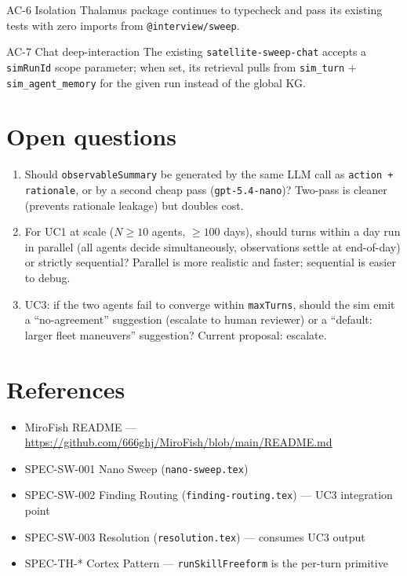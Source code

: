 \begin{ac}{AC-6 Isolation}
Thalamus package continues to typecheck and pass its existing tests with zero imports from \texttt{@interview/sweep}.
\end{ac}

\begin{ac}{AC-7 Chat deep-interaction}
The existing \texttt{satellite-sweep-chat} accepts a \texttt{simRunId} scope parameter; when set, its retrieval pulls from \texttt{sim\_turn} + \texttt{sim\_agent\_memory} for the given run instead of the global KG.
\end{ac}

\section{Open questions}
\begin{enumerate}[leftmargin=1.4em]
  \item Should \texttt{observableSummary} be generated by the same LLM call as \texttt{action + rationale}, or by a second cheap pass (\texttt{gpt-5.4-nano})? Two-pass is cleaner (prevents rationale leakage) but doubles cost.
  \item For UC1 at scale ($N \geq 10$ agents, $\geq 100$ days), should turns within a day run in parallel (all agents decide simultaneously, observations settle at end-of-day) or strictly sequential? Parallel is more realistic and faster; sequential is easier to debug.
  \item UC3: if the two agents fail to converge within \texttt{maxTurns}, should the sim emit a ``no-agreement'' suggestion (escalate to human reviewer) or a ``default: larger fleet maneuvers'' suggestion? Current proposal: escalate.
\end{enumerate}

\section{References}
\begin{itemize}[leftmargin=1.2em]
  \item MiroFish README --- \url{https://github.com/666ghj/MiroFish/blob/main/README.md}
  \item SPEC-SW-001 Nano Sweep (\texttt{nano-sweep.tex})
  \item SPEC-SW-002 Finding Routing (\texttt{finding-routing.tex}) --- UC3 integration point
  \item SPEC-SW-003 Resolution (\texttt{resolution.tex}) --- consumes UC3 output
  \item SPEC-TH-* Cortex Pattern --- \texttt{runSkillFreeform} is the per-turn primitive
\end{itemize}


